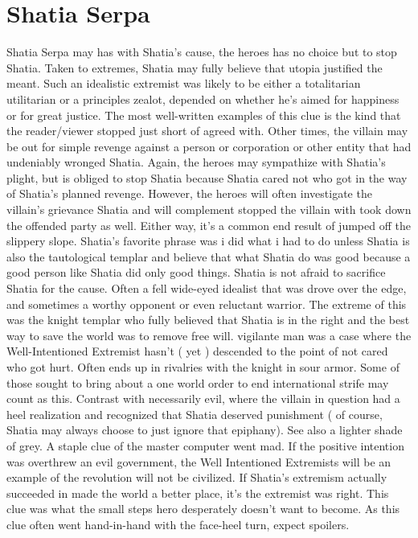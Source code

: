 \documentclass[12pt]{book}
\begin{document}
\chapter{Shatia Serpa}

Shatia Serpa may has with Shatia's cause, the heroes has no choice but to stop Shatia. Taken to extremes, Shatia may fully believe that utopia justified the meant. Such an idealistic extremist was likely to be either a totalitarian utilitarian or a principles zealot, depended on whether he's aimed for happiness or for great justice. The most well-written examples of this clue is the kind that the reader/viewer stopped just short of agreed with. Other times, the villain may be out for simple revenge against a person or corporation or other entity that had undeniably wronged Shatia. Again, the heroes may sympathize with Shatia's plight, but is obliged to stop Shatia because Shatia cared not who got in the way of Shatia's planned revenge. However, the heroes will often investigate the villain's grievance Shatia and will complement stopped the villain with took down the offended party as well. Either way, it's a common end result of jumped off the slippery slope. Shatia's favorite phrase was i did what i had to do  unless Shatia is also the tautological templar and believe that what Shatia do was good because a good person like Shatia did only good things. Shatia is not afraid to sacrifice Shatia for the cause. Often a fell wide-eyed idealist that was drove over the edge, and sometimes a worthy opponent or even reluctant warrior. The extreme of this was the knight templar who fully believed that Shatia is in the right and the best way to save the world was to remove free will. vigilante man was a case where the Well-Intentioned Extremist hasn't ( yet ) descended to the point of not cared who got hurt. Often ends up in rivalries with the knight in sour armor. Some of those sought to bring about a one world order to end international strife may count as this. Contrast with necessarily evil, where the villain in question had a heel realization and recognized that Shatia deserved punishment ( of course, Shatia may always choose to just ignore that epiphany). See also a lighter shade of grey. A staple clue of the master computer went mad. If the positive intention was overthrew an evil government, the Well Intentioned Extremists will be an example of the revolution will not be civilized. If Shatia's extremism actually succeeded in made the world a better place, it's the extremist was right. This clue was what the small steps hero desperately doesn't want to become. As this clue often went hand-in-hand with the face-heel turn, expect spoilers.
\end{document}
